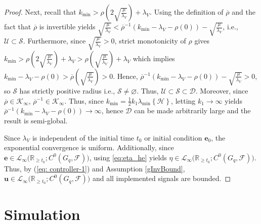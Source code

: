 \documentclass[letterpaper, 10 pt, conference]{ieeeconf}
\newcommand{\R}{\mathbb{R}}
\newcommand{\FF}{\mathcal{F}}
\theoremstyle{definition}
\begin{document}
\begin{proof}
Next, recall that $k_{\min}>\rho\left(2\sqrt{\frac{\mu}{\lambda_{V}}}\right)+\lambda_{V}$.
Using the definition of $\overline{\rho}$ and the fact that $\overline{\rho}$
is invertible yields $\sqrt{\frac{\mu}{\lambda_{V}}}<\overline{\rho}^{-1}\left(k_{\min}-\lambda_{V}-\rho\left(0\right)\right)-\sqrt{\frac{\mu}{\lambda_{V}}}$,
i.e., $\mathcal{U}\subset\mathcal{S}$. Furthermore, since $\sqrt{\frac{\mu}{\lambda_{V}}}>0$,
strict monotonicity of $\rho$ gives $k_{\min}>\rho\left(2\sqrt{\frac{\mu}{\lambda_{V}}}\right)+\lambda_{V}>\rho\left(\sqrt{\frac{\mu}{\lambda_{V}}}\right)+\lambda_{V}$
which implies $k_{\min}-\lambda_{V}-\rho\left(0\right)>\overline{\rho}\left(\sqrt{\frac{\mu}{\lambda_{V}}}\right)>0$.
Hence, $\overline{\rho}^{-1}\left(k_{\min}-\lambda_{V}-\rho\left(0\right)\right)-\sqrt{\frac{\mu}{\lambda_{V}}}>0$,
so $\mathcal{S}$ has strictly positive radius i.e., $\mathcal{S}\neq\varnothing$.
Thus, $\mathcal{U}\subset\mathcal{S}\subset\mathcal{D}$. Moreover,
since $\overline{\rho}\in\mathcal{K}_{\infty}$, $\overline{\rho}^{-1}\in\mathcal{K}_{\infty}$.
Thus, since $k_{\min}=\frac{1}{2}k_{1}\lambda_{\min}\left\{ \mathcal{H}\right\} $,
letting $k_{1}\to\infty$ yields $\overline{\rho}^{-1}\left(k_{\min}-\lambda_{V}-\rho\left(0\right)\right)\to\infty$,
hence $\mathcal{D}$ can be made arbitrarily large and the result
is semi-global.

Since $\lambda_{V}$ is independent of the initial time $t_{0}$ or
initial condition $\mathbf{e}_{0}$, the exponential convergence
is uniform. Additionally, since $\mathbf{e}\in\mathcal{L}_\infty \bigl(\R_{\geq t_0};C^0(G_q,\FF)\bigr)$, using \eqref{eq:eta_he} yields $\eta\in\mathcal{L}_\infty \bigl(\R_{\geq t_0};C^0(G_q,\FF)\bigr)$. Thus, by (\ref{eq: controller-1})
and Assumption \ref{gInvBound}, $ \mathbf{u}\in \mathcal{L}_\infty \bigl(\R_{\geq t_0};C^0(G_q,\FF)\bigr) $ and all implemented signals are bounded.
\end{proof}


\section{Simulation}
\end{document}
